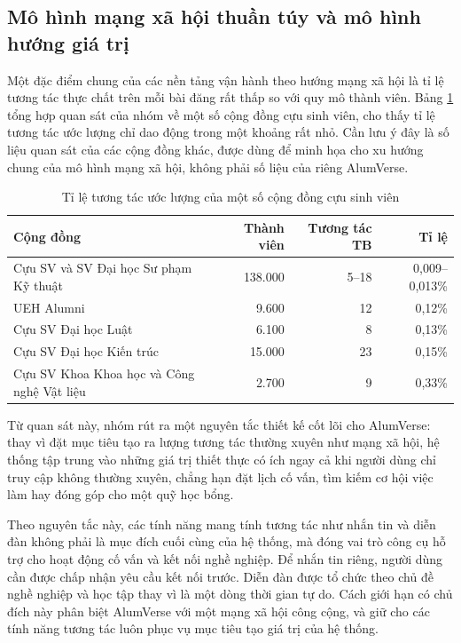 \documentclass[12pt,a4paper,oneside]{report}
\begin{document}
\subsection{Mô hình mạng xã hội thuần túy và mô hình hướng giá trị}

Một đặc điểm chung của các nền tảng vận hành theo hướng mạng xã hội là tỉ lệ tương tác thực chất trên mỗi bài đăng rất thấp so với quy mô thành viên. Bảng \ref{tab:engagement} tổng hợp quan sát của nhóm về một số cộng đồng cựu sinh viên, cho thấy tỉ lệ tương tác ước lượng chỉ dao động trong một khoảng rất nhỏ. Cần lưu ý đây là số liệu quan sát của các cộng đồng khác, được dùng để minh họa cho xu hướng chung của mô hình mạng xã hội, không phải số liệu của riêng AlumVerse.

\renewcommand{\arraystretch}{1.25}
\begin{table}[H]
\centering
\small
\caption{Tỉ lệ tương tác ước lượng của một số cộng đồng cựu sinh viên}
\label{tab:engagement}
\begin{tabular}{|>{\raggedright\arraybackslash}p{6.4cm}|r|r|r|}
\hline
\textbf{Cộng đồng} & \textbf{Thành viên} & \textbf{Tương tác TB} & \textbf{Tỉ lệ} \\ \hline
Cựu SV và SV Đại học Sư phạm Kỹ thuật & 138.000 & 5--18 & 0,009--0,013\% \\ \hline
UEH Alumni & 9.600 & 12 & 0,12\% \\ \hline
Cựu SV Đại học Luật & 6.100 & 8 & 0,13\% \\ \hline
Cựu SV Đại học Kiến trúc & 15.000 & 23 & 0,15\% \\ \hline
Cựu SV Khoa Khoa học và Công nghệ Vật liệu & 2.700 & 9 & 0,33\% \\ \hline
\end{tabular}
\end{table}
\renewcommand{\arraystretch}{1}

Từ quan sát này, nhóm rút ra một nguyên tắc thiết kế cốt lõi cho AlumVerse: thay vì đặt mục tiêu tạo ra lượng tương tác thường xuyên như mạng xã hội, hệ thống tập trung vào những giá trị thiết thực có ích ngay cả khi người dùng chỉ truy cập không thường xuyên, chẳng hạn đặt lịch cố vấn, tìm kiếm cơ hội việc làm hay đóng góp cho một quỹ học bổng.

Theo nguyên tắc này, các tính năng mang tính tương tác như nhắn tin và diễn đàn không phải là mục đích cuối cùng của hệ thống, mà đóng vai trò công cụ hỗ trợ cho hoạt động cố vấn và kết nối nghề nghiệp. Để nhắn tin riêng, người dùng cần được chấp nhận yêu cầu kết nối trước. Diễn đàn được tổ chức theo chủ đề nghề nghiệp và học tập thay vì là một dòng thời gian tự do. Cách giới hạn có chủ đích này phân biệt AlumVerse với một mạng xã hội công cộng, và giữ cho các tính năng tương tác luôn phục vụ mục tiêu tạo giá trị của hệ thống.
\end{document}
